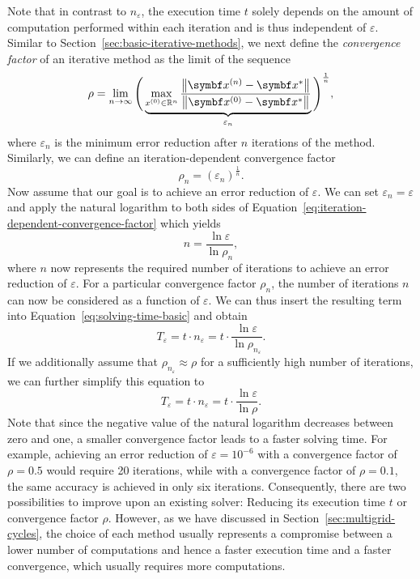 Note that in contrast to $n_{\varepsilon}$, the execution time $t$ solely depends on the amount of computation performed within each iteration and is thus independent of $\varepsilon$.
Similar to Section~\ref{sec:basic-iterative-methods}, we next define the \emph{convergence factor} of an iterative method as the limit of the sequence
\begin{equation*}
	\rho = \lim \limits_{n \to  \infty} \Bigg( \underbrace{ \max \limits_{x^{(0)} \in \mathbb{R}^{n}} \frac{\norm{\bm{x}^{(n)} - \bm{x}^{*}}}{\norm{\bm{x}^{(0)} - \bm{x}^{*}}} }_{\varepsilon_n} \Bigg)^{\frac{1}{n}},
\end{equation*}
where $\varepsilon_n$  is the minimum error reduction after $n$ iterations of the method.
Similarly, we can define an iteration-dependent convergence factor
\begin{equation}
	\rho_n = \left( \varepsilon_n \right)^{\frac{1}{n}}.
	\label{eq:iteration-dependent-convergence-factor}
\end{equation} 
Now assume that our goal is to achieve an error reduction of $\varepsilon$.
We can set $\varepsilon_n = \varepsilon$ and apply the natural logarithm to both sides of Equation~\eqref{eq:iteration-dependent-convergence-factor} which yields
\begin{equation*}
	n = \frac{\ln \varepsilon}{\ln \rho_n},
\end{equation*} 
where $n$ now represents the required number of iterations to achieve an error reduction of $\varepsilon$.
For a particular convergence factor $\rho_n$, the number of iterations $n$ can now be considered as a function of $\varepsilon$. 
We can thus insert the resulting term into Equation~\eqref{eq:solving-time-basic} and obtain
\begin{equation*}
	T_{\varepsilon} = t \cdot n_{\varepsilon} = t \cdot \frac{\ln \varepsilon}{\ln \rho_{n_{\varepsilon}}}.
\end{equation*} 
If we additionally assume that $\rho_{n_{\varepsilon}} \approx \rho$ for a sufficiently high number of iterations, we can further simplify this equation to
\begin{equation}
	T_{\varepsilon} = t \cdot n_{\varepsilon} = t \cdot \frac{\ln \varepsilon}{\ln \rho}.
	\label{eq:solving-time}
\end{equation} 
Note that since the negative value of the natural logarithm decreases between zero and one, a smaller convergence factor leads to a faster solving time.
For example, achieving an error reduction of $\varepsilon = 10^{-6}$ with a convergence factor of $\rho = 0.5$ would require 20 iterations, while with a convergence factor of $\rho = 0.1$, the same accuracy is achieved in only six iterations.
Consequently, there are two possibilities to improve upon an existing solver: Reducing its execution time $t$ or convergence factor $\rho$. 
However, as we have discussed in Section~\ref{sec:multigrid-cycles}, the choice of each method usually represents a compromise between a lower number of computations and hence a faster execution time and a faster convergence, which usually requires more computations.

